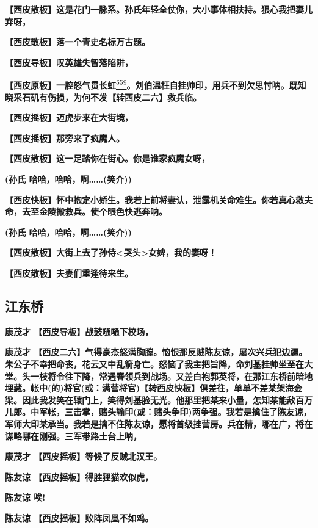 \textbf{【西皮散板】这是花门一脉系。孙氏年轻全仗你，大小事体相扶持。狠心我把妻儿弃呀，}

\textbf{【西皮散板】落一个青史名标万古题。}

\textbf{【西皮导板】叹英雄失智落陷阱，}

\textbf{【西皮原板】一腔怒气贯长虹}\protect\hyperlink{fn559}{\textsuperscript{559}}\textbf{。刘伯温枉自挂帅印，用兵不到欠思忖呐。既知晓采石矶有伤损，为何不发【转西皮二六】救兵临。}

\textbf{【西皮摇板】迈虎步来在大街境，}

\textbf{【西皮摇板】那旁来了疯魔人。}

\textbf{【西皮散板】这一足踏你在街心。你是谁家疯魔女呀，}

\textbf{(孙氏 哈哈，哈哈，啊\ldots{}\ldots{}(笑介))}

\textbf{【西皮快板】怀中抱定小娇生。我若上前将妻认，泄露机关命难生。你若真心救夫命，去至金陵搬救兵。使个眼色快逃奔呐。}

\textbf{(孙氏 哈哈，哈哈，啊\ldots{}\ldots{}(笑介))}

\textbf{【西皮散板】大街上去了孙侍\textless{}哭头\textgreater{}女婢，我的妻呀！}

\textbf{【西皮散板】夫妻们重逢待来生。}

\hypertarget{ux6c5fux4e1cux6865}{%
\subsection{江东桥}\label{ux6c5fux4e1cux6865}}

\textbf{康茂才 【西皮导板】战鼓嗵嗵下校场，}

\textbf{康茂才
【西皮二六】气得豪杰怒满胸膛。恼恨那反贼陈友谅，屡次兴兵犯边疆。朱公子不幸把命丧，花云又中乱箭身亡。怒恼了我主把旨降，命刘基挂帅坐至在大堂。头一枝将令往下降，常遇春领兵到战场。又差白袍郭英将，在那江东桥前暗地埋藏。帐中(的)将官(或：满营将官)【转西皮快板】俱差往，单单不差某架海金梁。因此我发笑在辕门上，笑得刘基脸无光。他那里把某来小量，怎知某能敌百万儿郎。中军帐，三击掌，赌头输印(或：赌头争印)两争强。我若是擒住了陈友谅，军师大印某承当。我若是擒不住陈友谅，愿将首级挂营房。兵在精，哪在广，将在谋略哪在刚强。三军带路土台上呐，}

\textbf{康茂才 【西皮摇板】等候了反贼北汉王。}

\textbf{陈友谅 【西皮摇板】得胜狸猫欢似虎，}

\textbf{陈友谅 唉!}

\textbf{陈友谅 【西皮摇板】败阵凤凰不如鸡。}

